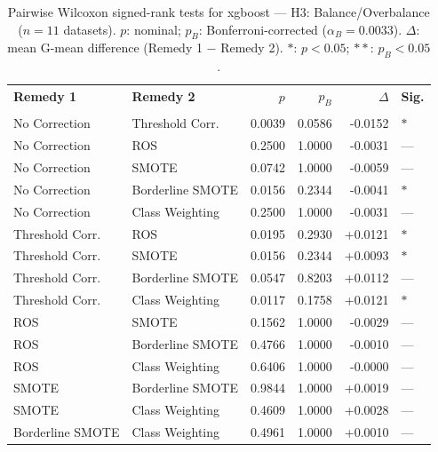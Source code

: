 \begin{table}[ht]
\centering
\scriptsize
\caption{Pairwise Wilcoxon signed-rank tests for xgboost --- H3: Balance/Overbalance ($n=11$ datasets). $p$: nominal; $p_B$: Bonferroni-corrected ($\alpha_B=0.0033$). $\Delta$: mean G-mean difference (Remedy 1 $-$ Remedy 2). $\ast$: $p<0.05$; $\ast\ast$: $p_B<0.05$.}
\label{tab:wilcoxon_xgboost_h3}
\begin{tabular}{llrrrl}
\toprule
\textbf{Remedy 1} & \textbf{Remedy 2} & \textbf{$p$} & \textbf{$p_B$} & \textbf{$\Delta$} &  \textbf{Sig.} \\\\
\midrule
    No Correction & Threshold Corr. & 0.0039 & 0.0586 & -0.0152 & $\ast$ \\
    No Correction & ROS & 0.2500 & 1.0000 & -0.0031 & --- \\
    No Correction & SMOTE & 0.0742 & 1.0000 & -0.0059 & --- \\
    No Correction & Borderline SMOTE & 0.0156 & 0.2344 & -0.0041 & $\ast$ \\
    No Correction & Class Weighting & 0.2500 & 1.0000 & -0.0031 & --- \\
    Threshold Corr. & ROS & 0.0195 & 0.2930 & +0.0121 & $\ast$ \\
    Threshold Corr. & SMOTE & 0.0156 & 0.2344 & +0.0093 & $\ast$ \\
    Threshold Corr. & Borderline SMOTE & 0.0547 & 0.8203 & +0.0112 & --- \\
    Threshold Corr. & Class Weighting & 0.0117 & 0.1758 & +0.0121 & $\ast$ \\
    ROS & SMOTE & 0.1562 & 1.0000 & -0.0029 & --- \\
    ROS & Borderline SMOTE & 0.4766 & 1.0000 & -0.0010 & --- \\
    ROS & Class Weighting & 0.6406 & 1.0000 & -0.0000 & --- \\
    SMOTE & Borderline SMOTE & 0.9844 & 1.0000 & +0.0019 & --- \\
    SMOTE & Class Weighting & 0.4609 & 1.0000 & +0.0028 & --- \\
    Borderline SMOTE & Class Weighting & 0.4961 & 1.0000 & +0.0010 & --- \\
\bottomrule
\end{tabular}
\end{table}